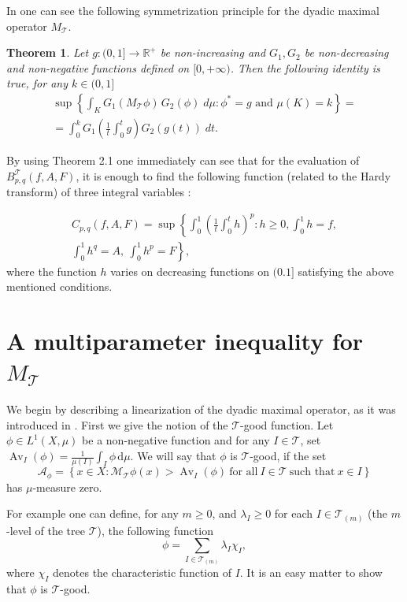 \documentclass{article}
\numberwithin{equation}{section}
\newtheorem{theorem}{Theorem}[section]
\theoremstyle{definition}
\theoremstyle{remark}
\newcommand{\mr}[1]{\mathrm{#1}}
\newcommand{\mc}[1]{\mathcal{#1}}
\DeclareMathOperator{\Av}{Av} %
\begin{document}
In \cite{NM} one can see the following symmetrization principle for the dyadic maximal operator $M_{\mc T}$.

\begin{theorem}\label{thm:2p1}
Let $g:(0,1]\longrightarrow \mathbb{R}^{+}$ be non-increasing and $G_1,G_2$ be non-decreasing and non-negative functions defined on $[0,+\infty)$. Then the following identity is true, for any $k\in (0,1]$
\begin{multline*}
\sup \left\lbrace \int_K G_1(M_{\mc T}\phi)\,G_2(\phi)\; d\mu: \phi^{*}=g \text{ and } \mu(K)=k  \right\rbrace=\\
= \int_0^k G_1\left( \frac{1}{t}\int_0^t g \right) G_2\left(g(t)\right) \; dt.
\end{multline*}
\end{theorem}

By using Theorem 2.1 one immediately can see that for the evaluation of  $B_{p,q}^{\mc T}(f,A,F)$, it is enough to find the following function (related to the Hardy transform) of three integral variables :

\begin{multline}
C_{p,q}(f,A,F) = \sup \left\{ \int_0^1 \left(\frac{1}{t}\int_0^t h\right)^p: h\geq 0, \int_0^1 h=f, \right. \\  \left. \int_0^1 h^q = A,\ \int_0^1 h^p = F\right\},
\end{multline} 
where the function $h$ varies on decreasing functions on $(0.1]$ satisfying the above mentioned conditions. 





\section{A multiparameter inequality for $M_{\mc T}$} \label{sec:3}
We begin by describing a linearization of the dyadic maximal operator, as it was introduced in \cite{M}. First we give the notion of the $\mc T$-good function. Let $\phi \in L^1(X,\mu)$ be a non-negative function and for any $I\in \mc T$, set $\Av_I(\phi) = \frac{1}{\mu(I)} \int_I \phi\,\mr d\mu$. We will say that $\phi$ is $\mc T$-good, if the set
\[
\mc A_\phi = \left\{ x\in X: \mc M_{\mc T}\phi(x) > \Av_I(\phi)\ \text{for all}\ I\in \mc T\ \text{such that}\ x\in I \right\}
\]
has $\mu$-measure zero.

For example one can define, for any $m\geq 0$, and $\lambda_I\geq 0$ for each $I\in \mc T_{(m)}$ (the $m$-level of the tree $\mc T$), the following function
\[
\phi=\sum_{I\in \mc T_{(m)}} \lambda_I \chi_I,
\]
where $\chi_I$ denotes the characteristic function of $I$. It is an easy matter to show that $\phi$ is $\mc T$-good.
\end{document}
